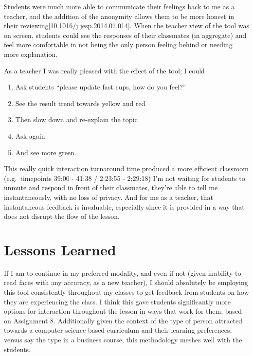 \documentclass[paper=a4,justified,a4paper]{tufte-handout}
\providecommand{\tightlist}{%
  \setlength{\itemsep}{0pt}\setlength{\parskip}{0pt}}
\begin{document}
Students were much more able to communicate their feelings back to me as
a teacher, and the addition of the anonymity allows them to be more
honest in their reviewing{[}10.1016/j.jesp.2014.07.014{]}. When the
teacher view of the tool was on screen, students could see the responses
of their classmates (in aggregate) and feel more comfortable in not
being the only person feeling behind or needing more explanation.

As a teacher I was really pleased with the effect of the tool; I could

\begin{enumerate}
\def\labelenumi{\arabic{enumi}.}
\tightlist
\item
  Ask students ``please update fast cups, how do you feel?''
\item
  See the result trend towards yellow and red
\item
  Then slow down and re-explain the topic
\item
  Ask again
\item
  And see more green.
\end{enumerate}

This really quick interaction turnaround time produced a more efficient
classroom (e.g.~timepoints 39:00 - 41:38 / 2:23:55 - 2:29:18) I'm not
waiting for students to unmute and respond in front of their classmates,
they're able to tell me instantaneously, with no loss of privacy. And
for me as a teacher, that instantaneous feedback is invaluable,
especially since it is provided in a way that does not disrupt the flow
of the lesson.

\hypertarget{lessons-learned}{%
\section{Lessons Learned}\label{lessons-learned}}

If I am to continue in my preferred modality, and even if not (given
inability to read faces with any accuracy, as a new teacher), I should
absolutely be employing this tool consistently throughout my classes to
get feedback from students on how they are experiencing the class. I
think this gave students significantly more options for interaction
throughout the lesson in ways that work for them, based on Assignment 8.
Additionally given the context of the type of person attracted towards a
computer science based curriculum and their learning preferences, versus
say the type in a business course, this methodology meshes well with the
students.
\end{document}
